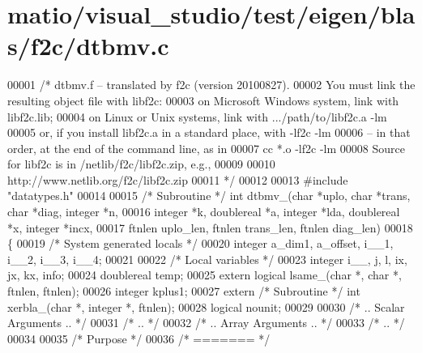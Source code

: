 \hypertarget{matio_2visual__studio_2test_2eigen_2blas_2f2c_2dtbmv_8c_source}{}\section{matio/visual\+\_\+studio/test/eigen/blas/f2c/dtbmv.c}
\label{matio_2visual__studio_2test_2eigen_2blas_2f2c_2dtbmv_8c_source}

\begin{DoxyCode}
00001 \textcolor{comment}{/* dtbmv.f -- translated by f2c (version 20100827).}
00002 \textcolor{comment}{   You must link the resulting object file with libf2c:}
00003 \textcolor{comment}{    on Microsoft Windows system, link with libf2c.lib;}
00004 \textcolor{comment}{    on Linux or Unix systems, link with .../path/to/libf2c.a -lm}
00005 \textcolor{comment}{    or, if you install libf2c.a in a standard place, with -lf2c -lm}
00006 \textcolor{comment}{    -- in that order, at the end of the command line, as in}
00007 \textcolor{comment}{        cc *.o -lf2c -lm}
00008 \textcolor{comment}{    Source for libf2c is in /netlib/f2c/libf2c.zip, e.g.,}
00009 \textcolor{comment}{}
00010 \textcolor{comment}{        http://www.netlib.org/f2c/libf2c.zip}
00011 \textcolor{comment}{*/}
00012 
00013 \textcolor{preprocessor}{#include "datatypes.h"}
00014 
00015 \textcolor{comment}{/* Subroutine */} \textcolor{keywordtype}{int} dtbmv\_(\textcolor{keywordtype}{char} *uplo, \textcolor{keywordtype}{char} *trans, \textcolor{keywordtype}{char} *diag, integer *n, 
00016     integer *k, doublereal *a, integer *lda, doublereal *x, integer *incx,
00017      ftnlen uplo\_len, ftnlen trans\_len, ftnlen diag\_len)
00018 \{
00019     \textcolor{comment}{/* System generated locals */}
00020     integer a\_dim1, a\_offset, i\_\_1, i\_\_2, i\_\_3, i\_\_4;
00021 
00022     \textcolor{comment}{/* Local variables */}
00023     integer i\_\_, j, l, ix, jx, kx, info;
00024     doublereal temp;
00025     \textcolor{keyword}{extern} logical lsame\_(\textcolor{keywordtype}{char} *, \textcolor{keywordtype}{char} *, ftnlen, ftnlen);
00026     integer kplus1;
00027     \textcolor{keyword}{extern} \textcolor{comment}{/* Subroutine */} \textcolor{keywordtype}{int} xerbla\_(\textcolor{keywordtype}{char} *, integer *, ftnlen);
00028     logical nounit;
00029 
00030 \textcolor{comment}{/*     .. Scalar Arguments .. */}
00031 \textcolor{comment}{/*     .. */}
00032 \textcolor{comment}{/*     .. Array Arguments .. */}
00033 \textcolor{comment}{/*     .. */}
00034 
00035 \textcolor{comment}{/*  Purpose */}
00036 \textcolor{comment}{/*  ======= */}

\end{DoxyCode}
